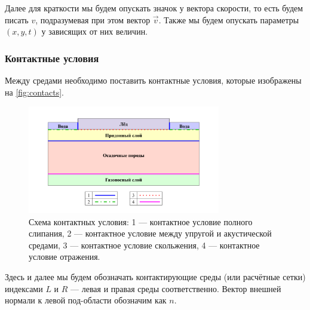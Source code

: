 Далее для краткости мы будем опускать значок у вектора скорости, то есть будем писать $v$, подразумевая при этом вектор $\vec{v}$. Также мы будем опускать параметры $(x,y,t)$ у зависящих от них величин.

\subsubsection{Контактные условия}

Между средами необходимо поставить контактные условия, которые изображены на \autoref{fig:contacts}.

\begin{figure}[H]
    \centering
    \includegraphics[trim={90pt 35pt 90pt 60pt},clip,width=0.75\textwidth]
    {images/gas_field/contacts.png}
    \caption{Схема контактных условия: 1 --- контактное условие полного слипания, 2 --- контактное условие между упругой и акустической средами, 3 --- контактное условие скольжения, 4 --- контактное условие отражения.}
    \label{fig:contacts}
\end{figure}

Здесь и далее мы будем обозначать контактирующие среды (или расчётные сетки) индексами $L$ и $R$ --- левая и правая среды соответственно. Вектор внешней нормали к левой под-области обозначим как $n$.

